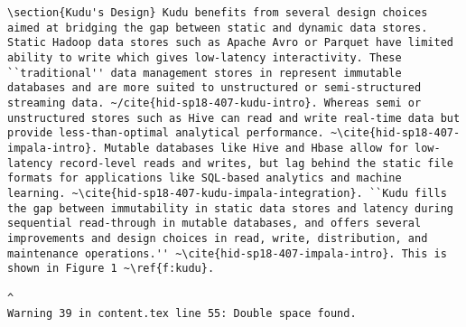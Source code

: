 \begin{tiny}
\begin{verbatim}
\section{Kudu's Design} Kudu benefits from several design choices aimed at bridging the gap between static and dynamic data stores. Static Hadoop data stores such as Apache Avro or Parquet have limited ability to write which gives low-latency interactivity. These ``traditional'' data management stores in represent immutable databases and are more suited to unstructured or semi-structured streaming data. ~/cite{hid-sp18-407-kudu-intro}. Whereas semi or unstructured stores such as Hive can read and write real-time data but provide less-than-optimal analytical performance. ~\cite{hid-sp18-407-impala-intro}. Mutable databases like Hive and Hbase allow for low-latency record-level reads and writes, but lag behind the static file formats for applications like SQL-based analytics and machine learning. ~\cite{hid-sp18-407-kudu-impala-integration}. ``Kudu fills the gap between immutability in static data stores and latency during sequential read-through in mutable databases, and offers several improvements and design choices in read, write, distribution, and maintenance operations.'' ~\cite{hid-sp18-407-impala-intro}. This is shown in Figure 1 ~\ref{f:kudu}.   
                                                                                                                                                                                                                                                                                                                                                                                                                                                                                                                                                                                                                                                                                                                                                                                                                                                                                                                                                                                                                                                                                                                                                                                                ^
Warning 39 in content.tex line 55: Double space found.

\end{verbatim}
\end{tiny}
